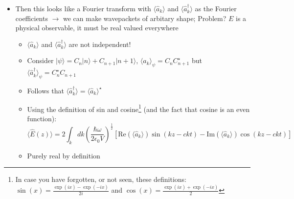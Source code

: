\documentclass[english]{article}
\newcommand{\ket}[1]{|#1 \rangle}
\newcommand{\average}[1]{\langle #1 \rangle}
\begin{document}
\begin{itemize}
\begin{itemize}
\end{itemize}
\item Then this looks like a Fourier transform with $\average{\hat{a}_k}$ and $\average{\hat{a}_k^\dagger}$ as the Fourier coefficients $\rightarrow$ we can make wavepackets of arbitary shape; 
Problem? $E$ is a physical observable, it must be real valued everywhere
\begin{itemize}
\item $\average{\hat{a}_k}$ and $\average{\hat{a}_k^\dagger}$ are not independent!
\item Consider $\ket{\psi}=C_n\ket{n}+C_{n+1}\ket{n+1}$, $\average{\hat{a}_k}_{\psi}=C_nC^\star_{n+1}$ but $\average{\hat{a}_k^\dagger}_\psi=C^\star_nC_{n+1}$
\item Follows that $\average{\hat{a}_k^\dagger}=\average{\hat{a}_k}^\star$
\item Using the definition of sin and cosine\footnote{In case you have forgotten, or not seen, these definitions: $\sin(x)=\frac{\exp(ix)-\exp(-ix)}{2i}$ and $\cos(x)=\frac{\exp(ix)+\exp(-ix)}{2}$ } (and the fact that cosine is an even function): 
\begin{equation}
\average{\hat{E}(z)}=2\int_kdk\left(\frac{\hbar \omega}{2 \epsilon_0 V}\right)^\frac{1}{2}[\mathrm{Re}(\average{\hat{a}_k}) \sin(k z-  c k t)-\mathrm{Im}(\average{\hat{a}_k}) \cos(k z-  c k t)]
\end{equation}
\item Purely real by definition
\end{itemize}
\end{itemize}
\end{document}
